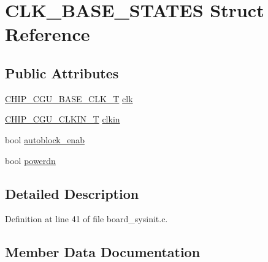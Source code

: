 \hypertarget{struct_c_l_k___b_a_s_e___s_t_a_t_e_s}{}\section{C\+L\+K\+\_\+\+B\+A\+S\+E\+\_\+\+S\+T\+A\+T\+ES Struct Reference}
\label{struct_c_l_k___b_a_s_e___s_t_a_t_e_s}
\subsection*{Public Attributes}
\begin{DoxyCompactItemize}
\item 
\hyperlink{chip__clocks_8h_a31e266dd83cc66eb866d8d051ffd1d45}{C\+H\+I\+P\+\_\+\+C\+G\+U\+\_\+\+B\+A\+S\+E\+\_\+\+C\+L\+K\+\_\+T} \hyperlink{struct_c_l_k___b_a_s_e___s_t_a_t_e_s_a7a5ae23b52378a312005a0546025b451}{clk}
\item 
\hyperlink{group___c_l_o_c_k__18_x_x__43_x_x_ga0975326707efebf2b074283e6c602f18}{C\+H\+I\+P\+\_\+\+C\+G\+U\+\_\+\+C\+L\+K\+I\+N\+\_\+T} \hyperlink{struct_c_l_k___b_a_s_e___s_t_a_t_e_s_a0701337c77a20b9bce829c993c7e4810}{clkin}
\item 
bool \hyperlink{struct_c_l_k___b_a_s_e___s_t_a_t_e_s_a74e4f9da90255b93979257d246560e21}{autoblock\+\_\+enab}
\item 
bool \hyperlink{struct_c_l_k___b_a_s_e___s_t_a_t_e_s_a63f95bda928248fed82ff1fa7d930fd1}{powerdn}
\end{DoxyCompactItemize}


\subsection{Detailed Description}


Definition at line 41 of file board\+\_\+sysinit.\+c.



\subsection{Member Data Documentation}
\mbox{\label{struct_c_l_k___b_a_s_e___s_t_a_t_e_s_a74e4f9da90255b93979257d246560e21}} 
